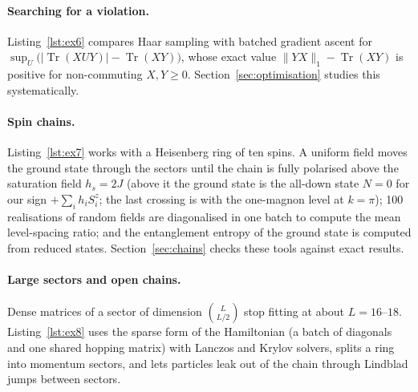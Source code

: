 \documentclass[11pt]{article}
\DeclareMathOperator{\Tr}{Tr}
\begin{document}
\paragraph{Searching for a violation.} Listing~\ref{lst:ex6} compares Haar sampling with batched gradient
ascent for $\sup_U\bigl(|\Tr(XUY)|-\Tr(XY)\bigr)$, whose exact value $\|YX\|_1-\Tr(XY)$ is positive for
non-commuting $X,Y\ge0$. Section~\ref{sec:optimisation} studies this systematically.


\paragraph{Spin chains.} Listing~\ref{lst:ex7} works with a Heisenberg ring of ten spins. A uniform field
moves the ground state through the sectors until the chain is fully polarised above the saturation
field $h_s=2J$ (above it the ground state is the all-down state $N=0$ for our sign $+\sum_ih_iS^z_i$; the last
crossing is with the one-magnon level at $k=\pi$); 100 realisations of random fields are diagonalised in one batch to compute the mean
level-spacing ratio; and the entanglement entropy of the ground state is computed from reduced states.
Section~\ref{sec:chains} checks these tools against exact results.


\paragraph{Large sectors and open chains.} Dense matrices of a sector of dimension $\binom{L}{L/2}$ stop
fitting at about $L=16$--$18$. Listing~\ref{lst:ex8} uses the sparse form of the Hamiltonian (a batch of
diagonals and one shared hopping matrix) with Lanczos and Krylov solvers, splits a ring into momentum
sectors, and lets particles leak out of the chain through Lindblad jumps between sectors.

\end{document}
